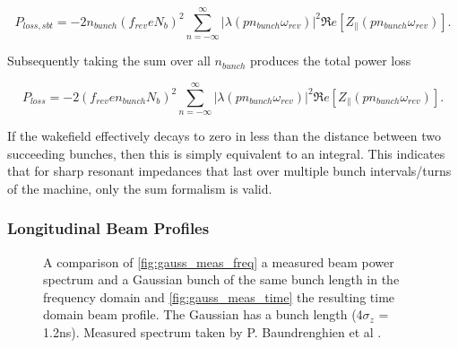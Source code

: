 \begin{equation}
P_{loss, sbt} = - 2 n_{bunch} \left( f_{rev} e  N_{b} \right) ^{2} \displaystyle\sum\limits_{n = -\infty}^{\infty}  \left| \lambda \left( p n_{bunch} \omega_{rev} \right)  \right|^{2} \Re{}e \left[ Z_{\parallel} \left( p n_{bunch}\omega_{rev} \right) \right].
\label{eqn:power_loss_train_single_bunch}
\end{equation}

Subsequently taking the sum over all $n_{bunch}$ produces the total power loss 

\begin{equation}
P_{loss} = - 2 \left( f_{rev} e n_{bunch}  N_{b}\right)^{2} \displaystyle\sum\limits_{n = -\infty}^{\infty}  \left| \lambda \left( p n_{bunch} \omega_{rev} \right)  \right|^{2} \Re{}e \left[ Z_{\parallel} \left( p n_{bunch}\omega_{rev} \right) \right].
\label{eqn:heating-gen}
\end{equation}

If the wakefield effectively decays to zero in less than the distance between two succeeding bunches, then this is simply equivalent to an integral. This indicates that for sharp resonant impedances that last over multiple bunch intervals/turns of the machine, only the sum formalism is valid.

\subsubsection{Longitudinal Beam Profiles}

\begin{figure}
\caption{A comparison of \ref{fig:gauss_meas_freq} a measured beam power spectrum and a Gaussian bunch of the same bunch length in the frequency domain and \ref{fig:gauss_meas_time} the resulting time domain beam profile. The Gaussian has a bunch length (4$\sigma_{z}$ = 1.2ns). Measured spectrum taken by P. Baundrenghien et al \cite{Baudrenghien:LHCPowSpec}.}
\label{fig:measured_gauss}
\end{figure}

